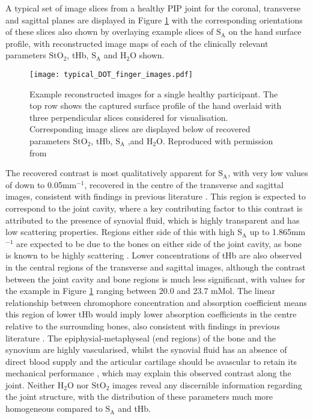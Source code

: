 \documentclass[twoside]{bhamthesis}
\theoremstyle{definition}
\begin{document}
A typical set of image slices from a healthy PIP joint for the coronal, transverse and sagittal planes are displayed in Figure \ref{Typical healthy} with the corresponding orientations of these slices also shown by overlaying example slices of $\mathrm{S_A}$ on the hand surface profile, with reconstructed image maps of each of the clinically relevant parameters $\mathrm{StO_2}$, tHb, $\mathrm{S_A}$ and $\mathrm{H_2O}$ shown.

\begin{figure}[!ht]
\centering\texttt{[image: typical\_DOT\_finger\_images.pdf]}
\caption{Example reconstructed images for a single healthy participant. The top row shows the captured surface profile of the hand overlaid with three perpendicular slices considered for visualisation. Corresponding image slices are displayed below of recovered parameters $\mathrm{StO_2}$, tHb, $\mathrm{S_A}$ ,and $\mathrm{H_2O}$. Reproduced with permission from \cite{lighter2018multispectral}}
\label{Typical healthy}
\end{figure}

The recovered contrast is most qualitatively apparent for $\mathrm{S_A}$, with very low values of down to 0.05mm$^{-1}$, recovered in the centre of the transverse and sagittal images, consistent with findings in previous literature \cite{montejo2013computer,yuan2010image}. This region is expected to correspond to the joint cavity, where a key contributing factor to this contrast is attributed to the presence of synovial fluid, which is highly transparent and has low scattering properties. Regions either side of this with high $\mathrm{S_A}$ up to 1.865mm$^{-1}$ are expected to be due to the bones on either side of the joint cavity, as bone is known to be highly scattering \cite{alexandrakis2005tomographic}. Lower concentrations of tHb are also observed in the central regions of the transverse and sagittal images, although the contrast between the joint cavity and bone regions is much less significant, with values for the example in Figure \ref{Typical healthy} ranging between 20.0 and 23.7 mMol. The linear relationship between chromophore concentration and absorption coefficient means this region of lower tHb would imply lower absorption coefficients in the centre relative to the surrounding bones, also consistent with findings in previous literature \cite{montejo2013computer,yuan2010image}. The epiphysial-metaphyseal (end regions) of the bone and the synovium are highly vascularised, whilst the synovial fluid has an absence of direct blood supply and the articular cartilage should be avascular to retain its mechanical performance \cite{haywood2001vasculature}, which may explain this observed contrast along the joint. Neither $\mathrm{H_2O}$ nor $\mathrm{StO_2}$ images reveal any discernible information regarding the joint structure, with the distribution of these parameters much more homogeneous compared to $\mathrm{S_A}$ and tHb. 
\end{document}
